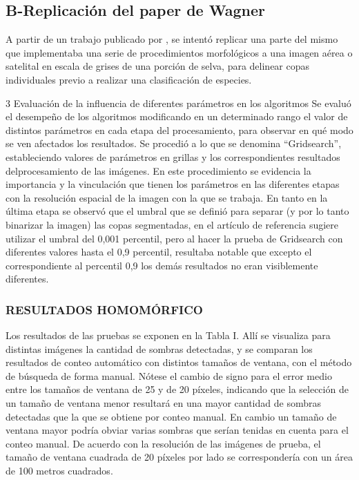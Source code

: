\subsection{B-Replicación del paper de Wagner}
A partir de un trabajo publicado por \cite{hubert_wagner_individual_2018}, se intentó replicar una parte del mismo que implementaba una serie de procedimientos morfológicos a una imagen aérea o satelital en escala de grises de una porción de selva, para delinear copas individuales previo a realizar una clasificación de especies.

3 Evaluación de la influencia de diferentes parámetros en los 
algoritmos
Se evaluó el desempeño de los algoritmos modificando en un determinado rango el
valor de distintos parámetros en cada etapa del procesamiento, para observar en qué
modo se ven afectados los resultados. Se procedió a lo que se denomina “Gridsearch”,
estableciendo valores de parámetros en grillas y los correspondientes resultados delprocesamiento de las imágenes. En este procedimiento se evidencia la importancia y la
vinculación que tienen los parámetros en las diferentes etapas con la resolución espacial
de la imagen con la que se trabaja. En tanto en la última etapa se observó que el umbral
que se definió para separar (y por lo tanto binarizar la imagen) las copas segmentadas,
en el artículo de referencia sugiere utilizar el umbral del 0,001 percentil, pero al hacer la
prueba de Gridsearch con diferentes valores hasta el 0,9 percentil, resultaba notable que
excepto el correspondiente al percentil 0,9 los demás resultados no eran visiblemente
diferentes.
\subsubsection{RESULTADOS HOMOMÓRFICO}
Los resultados de las pruebas se exponen en la Tabla I. Allí se visualiza para distintas imágenes la cantidad de sombras detectadas, y se comparan los resultados de conteo automático con distintos tamaños de ventana, con el método de búsqueda de forma manual. Nótese el cambio de signo para el error medio entre los tamaños de ventana de 25 y de 20 píxeles, indicando que la selección de un tamaño de ventana menor resultará en una mayor 
cantidad de sombras detectadas que la que se obtiene por conteo manual. En cambio un tamaño de ventana mayor podría obviar varias sombras que serían tenidas en cuenta para el conteo manual. De acuerdo con la resolución de las imágenes de prueba, el tamaño de ventana cuadrada de 20 píxeles por lado se correspondería con un área de 100 metros cuadrados.




